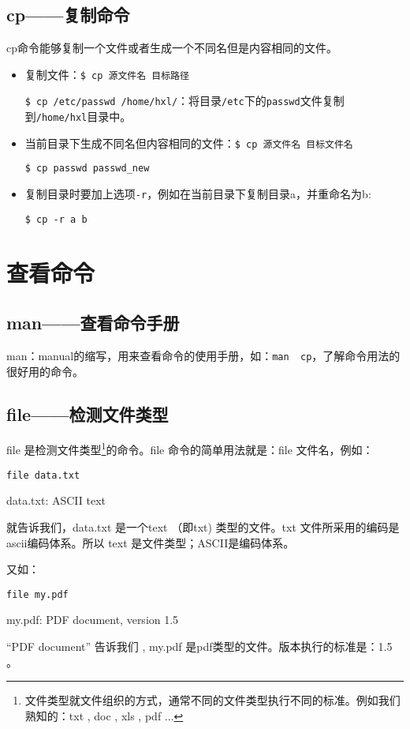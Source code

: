 \subsection{cp——复制命令}
cp命令能够复制一个文件或者生成一个不同名但是内容相同的文件。
\begin{itemize}
\item 复制文件：\verb*|$ cp 源文件名 目标路径|

\verb*|$ cp /etc/passwd /home/hxl/|：将目录\verb|/etc|下的\verb|passwd|文件复制到\verb|/home/hxl|目录中。

\item 当前目录下生成不同名但内容相同的文件：\verb*|$ cp 源文件名 目标文件名|

\verb*|$ cp passwd passwd_new|

\item 复制目录时要加上选项\verb*|-r|，例如在当前目录下复制目录a，并重命名为b:

\verb*|$ cp -r a b|
\end{itemize}


\section{查看命令}
\subsection{man——查看命令手册}
man：manual的缩写，用来查看命令的使用手册，如：\verb*|man  cp|，了解命令用法的很好用的命令。


\subsection{file——检测文件类型}
 file 是检测文件类型\footnote{文件类型就文件组织的方式，通常不同的文件类型执行不同的标准。例如我们熟知的：txt , doc , xls , pdf ...}的命令。file 命令的简单用法就是：file 文件名，例如：

\verb*|file data.txt|

data.txt: ASCII text

就告诉我们，data.txt 是一个text （即txt) 类型的文件。txt 文件所采用的编码是ascii编码体系。所以 text 是文件类型；ASCII是编码体系。

又如：

\verb*|file my.pdf|

my.pdf: PDF document, version 1.5

“PDF document” 告诉我们 , my.pdf 是pdf类型的文件。版本执行的标准是：1.5 。

